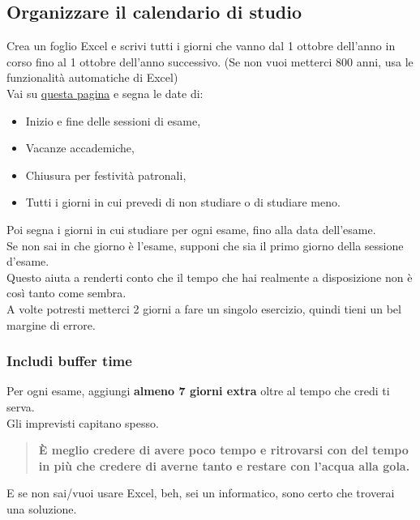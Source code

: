 \documentclass[18pt]{extarticle}
\begin{document}
\subsection{Organizzare il calendario di studio}
Crea un foglio Excel e scrivi tutti i giorni che vanno dal 1 ottobre dell'anno in corso fino al 1 ottobre dell'anno successivo. (Se non vuoi metterci 800 anni, usa le funzionalità automatiche di Excel)\\
Vai su \href{https://www.uniud.it/it/didattica/corsi/area-scientifica/scienze-matematiche-informatiche-multimediali-fisiche/laurea/informatica/studiare/orario-lezioni}{questa pagina} e segna le date di:
\begin{itemize}
\item Inizio e fine delle sessioni di esame,
\item Vacanze accademiche,
\item Chiusura per festività patronali,
\item Tutti i giorni in cui prevedi di non studiare o di studiare meno.
\end{itemize}
Poi segna i giorni in cui studiare per ogni esame, fino alla data dell'esame.\\
Se non sai in che giorno è l'esame, supponi che sia il primo giorno della sessione d'esame.\\
Questo aiuta a renderti conto che il tempo che hai realmente a disposizione non è così tanto come sembra.\\
A volte potresti metterci 2 giorni a fare un singolo esercizio, quindi tieni un bel margine di errore.


\subsubsection{Includi buffer time}
Per ogni esame, aggiungi \textbf{almeno 7 giorni extra} oltre al tempo che credi ti serva.\\
Gli imprevisti capitano spesso.
\begin{quote}
\textbf{È meglio credere di avere poco tempo e ritrovarsi con del tempo in più che credere di averne tanto e restare con l'acqua alla gola.}
\end{quote}%
E se non sai/vuoi usare Excel, beh, sei un informatico, sono certo che troverai una soluzione.
\end{document}
